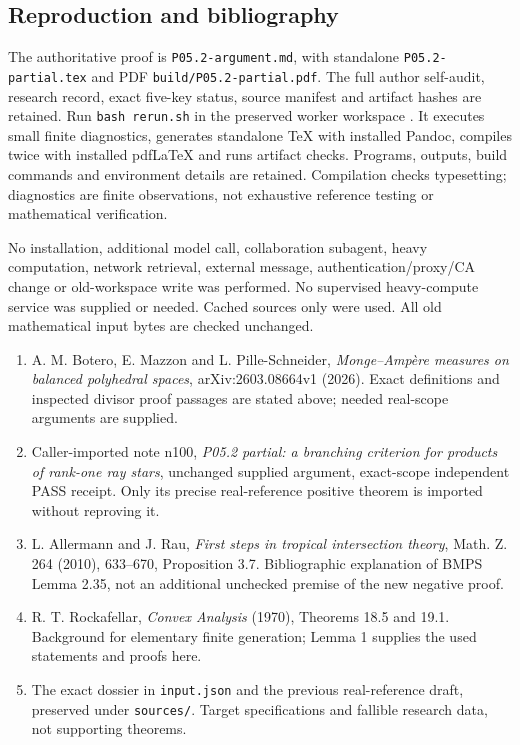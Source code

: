 \documentclass[
  11pt,
]{article}
\providecommand{\tightlist}{%
  \setlength{\itemsep}{0pt}\setlength{\parskip}{0pt}}
\begin{document}
\subsection{Reproduction and
bibliography}\label{reproduction-and-bibliography}

The authoritative proof is \texttt{P05.2-argument.md}, with standalone
\texttt{P05.2-partial.tex} and PDF \texttt{build/P05.2-partial.pdf}. The
full author self-audit, research record, exact five-key status, source
manifest and artifact hashes are retained. Run \texttt{bash\ rerun.sh}
in the preserved worker workspace
.
It executes small finite diagnostics, generates
standalone TeX with installed Pandoc, compiles twice with installed
pdfLaTeX and runs artifact checks. Programs, outputs, build commands and
environment details are retained. Compilation checks typesetting;
diagnostics are finite observations, not exhaustive reference testing or
mathematical verification.

No installation, additional model call, collaboration subagent, heavy
computation, network retrieval, external message,
authentication/proxy/CA change or old-workspace write was performed. No
supervised heavy-compute service was supplied or needed. Cached sources
only were used. All old mathematical input bytes are checked unchanged.

\begin{enumerate}
\def\labelenumi{\arabic{enumi}.}
\tightlist
\item
  A. M. Botero, E. Mazzon and L. Pille-Schneider, \emph{Monge--Ampère
  measures on balanced polyhedral spaces}, arXiv:2603.08664v1 (2026).
  Exact definitions and inspected divisor proof passages are stated
  above; needed real-scope arguments are supplied.
\item
  Caller-imported note n100, \emph{P05.2 partial: a branching criterion
  for products of rank-one ray stars}, unchanged supplied argument,
  exact-scope independent PASS receipt. Only its precise real-reference
  positive theorem is imported without reproving it.
\item
  L. Allermann and J. Rau, \emph{First steps in tropical intersection
  theory}, Math. Z. 264 (2010), 633--670, Proposition 3.7. Bibliographic
  explanation of BMPS Lemma 2.35, not an additional unchecked premise of
  the new negative proof.
\item
  R. T. Rockafellar, \emph{Convex Analysis} (1970), Theorems 18.5 and
  19.1. Background for elementary finite generation; Lemma 1 supplies
  the used statements and proofs here.
\item
  The exact dossier in \texttt{input.json} and the previous
  real-reference draft, preserved under \texttt{sources/}. Target
  specifications and fallible research data, not supporting theorems.
\end{enumerate}
\end{document}
